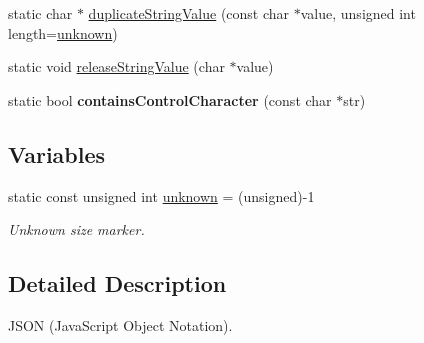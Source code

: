 \begin{DoxyCompactItemize}
\item 
static char $\ast$ \hyperlink{namespace_json_a9e2c18331f84669e6194dcfc124afcd2}{duplicate\-String\-Value} (const char $\ast$value, unsigned int length=\hyperlink{namespace_json_a54414e1e582b6a3769a61e049103fd11}{unknown})
\item 
static void \hyperlink{namespace_json_acf8dd162c01e37846e129556c50e4037}{release\-String\-Value} (char $\ast$value)
\item 
\hypertarget{namespace_json_aa11b210ff98a4f4dd4e2df19260f8c3a}{static bool {\bfseries contains\-Control\-Character} (const char $\ast$str)}\label{namespace_json_aa11b210ff98a4f4dd4e2df19260f8c3a}

\end{DoxyCompactItemize}
\subsection*{Variables}
\begin{DoxyCompactItemize}
\item 
\hypertarget{namespace_json_a54414e1e582b6a3769a61e049103fd11}{static const unsigned int \hyperlink{namespace_json_a54414e1e582b6a3769a61e049103fd11}{unknown} = (unsigned)-\/1}\label{namespace_json_a54414e1e582b6a3769a61e049103fd11}

\begin{DoxyCompactList}\small\item\em Unknown size marker. \end{DoxyCompactList}\end{DoxyCompactItemize}


\subsection{Detailed Description}
J\-S\-O\-N (Java\-Script Object Notation). 

